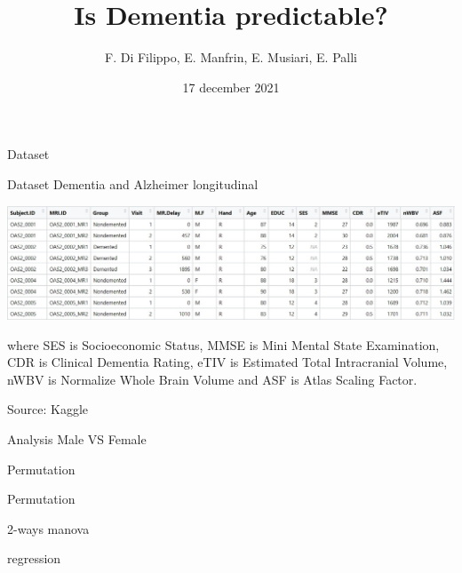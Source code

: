 \documentclass{beamer}
\title{Is Dementia predictable?}
\author{F. Di Filippo, E. Manfrin, E. Musiari, E. Palli}
\date{17 december 2021}
\begin{document}
\begin{frame}
\maketitle
\end{frame}


\begin{frame}{Dataset}

Dataset Dementia and Alzheimer longitudinal
\begin{center}
	
	
	\includegraphics[width=\columnwidth]{dataset_al.jpeg}
\end{center}


where SES is Socioeconomic Status, MMSE is Mini Mental State Examination, CDR is Clinical Dementia Rating, eTIV is Estimated Total Intracranial Volume, nWBV is Normalize Whole Brain Volume and ASF is Atlas Scaling Factor.

\vspace{0.1 cm}
Source: Kaggle


\end{frame}

\begin{frame}{Analysis Male VS Female}
	
\end{frame}


\begin{frame}{Permutation}

\end{frame}

\begin{frame}{Permutation}

\end{frame}

\begin{frame}{2-ways manova}

\end{frame}

\begin{frame}{regression}





\end{frame}
\end{document}
